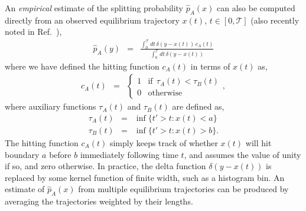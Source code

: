 \documentclass[aps,prl,twocolumn,superscriptaddress,floatfix]{revtex4-1}
\begin{document}
An \emph{empirical} estimate of the splitting probability $\hat{p}_A(x)$ can also be computed directly from an observed equilibrium trajectory $x(t)$, 
\color{black}
$t \in [0,\mathcal{T}]$ (also recently noted in Ref.~\cite{thirumalai:2011:prl:pfold}),
\begin{eqnarray}
\hat{p}_A(y) &=& \frac{\int_{0}^{\mathcal{T}} dt \, \delta(y - x(t)) \, c_A(t)}{\int_{0}^{\mathcal{T}} dt \, \delta(y - x(t))} \label{equation:empirical-splitting-probability}
\end{eqnarray}
where we have defined the hitting function $c_A(t)$ in terms of $x(t)$ as,
\begin{eqnarray}
c_A(t) &=& \begin{cases}
1 & \mathrm{if} \:\: \tau_A(t) < \tau_B(t) \\
0 & \mathrm{otherwise}
\end{cases} ,
\end{eqnarray}
where auxiliary functions $\tau_A(t)$ and $\tau_B(t)$ are defined as,
\begin{eqnarray}
\tau_A(t) &=& \inf \{ t' > t : x(t) < a \} \nonumber \\
\tau_B(t) &=& \inf \{ t' > t : x(t) > b \} .
\end{eqnarray}
\color{black}
The hitting function $c_A(t)$ simply keeps track of whether $x(t)$ will hit boundary $a$ before $b$ immediately following time $t$, and assumes the value of unity if so, and zero otherwise.
In practice, the delta function $\delta(y - x(t))$ is replaced by some kernel function of finite width, such as a histogram bin.
An estimate of $\hat{p}_A(x)$ from multiple equilibrium trajectories can be produced by averaging the trajectories weighted by their lengths.
\end{document}
